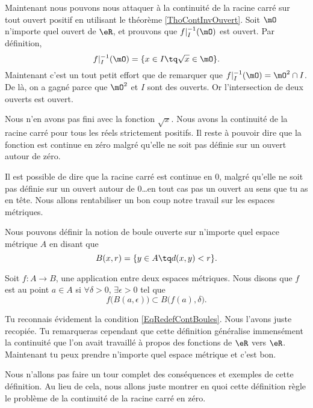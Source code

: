 Maintenant nous pouvons nous attaquer à la continuité de la racine carré sur tout ouvert positif en utilisant le théorème \ref{ThoContInvOuvert}. Soit $\mO$ n'importe quel ouvert de $\eR$, et prouvons que $f|_I^{-1}(\mO)$ est ouvert. Par définition,
\begin{equation}
  f|_I^{-1}(\mO)=\{ x\in I\tq \sqrt{x}\in\mO \}.
\end{equation}
Maintenant c'est un tout petit effort que de remarquer que $f|_I^{-1}(\mO)=\mO^2\cap I$. De là, on a gagné parce que $\mO^2$ et $I$ sont des ouverts. Or l'intersection de deux ouverts est ouvert. 

Nous n'en avons pas fini avec la fonction $\sqrt{x}$. Nous avons la continuité de la racine carré pour tous les réels strictement positifs. Il reste à pouvoir dire que la fonction est continue en zéro malgré qu'elle ne soit pas définie sur un ouvert autour de zéro. 

Il est possible de dire que la racine carré est continue en $0$, malgré qu'elle ne soit pas définie sur un ouvert autour de $0$\ldots en tout cas pas un ouvert au sens que tu as en tête. Nous allons rentabiliser un bon coup notre travail sur les espaces métriques.

Nous pouvons définir la notion de boule ouverte sur n'importe quel espace métrique $A$ en disant que
\[ 
  B(x,r)=\{ y\in A\tq d(x,y)<r \}.
\]
\begin{definition}      \label{DefContMetrique}
Soit $f\colon A\to B$, une application entre deux espaces métriques. Nous disons que $f$ est  au point $a\in A$ si $\forall \delta>0$, $\exists\epsilon>0$ tel que 
\begin{equation}
  f\big( B(a,\epsilon) \big)\subset B\big( f(a),\delta \big).
\end{equation}
\end{definition}
Tu reconnais évidement la condition \eqref{EqRedefContBoules}. Nous l'avons juste recopiée. Tu remarqueras cependant que cette définition généralise immensément la continuité que l'on avait travaillé à propos des fonctions de $\eR$ vers $\eR$. Maintenant tu peux prendre n'importe quel espace métrique et c'est bon.

Nous n'allons pas faire un tour complet des conséquences et exemples de cette définition. Au lieu de cela, nous allons juste montrer en quoi cette définition règle le problème de la continuité de la racine carré en zéro.

